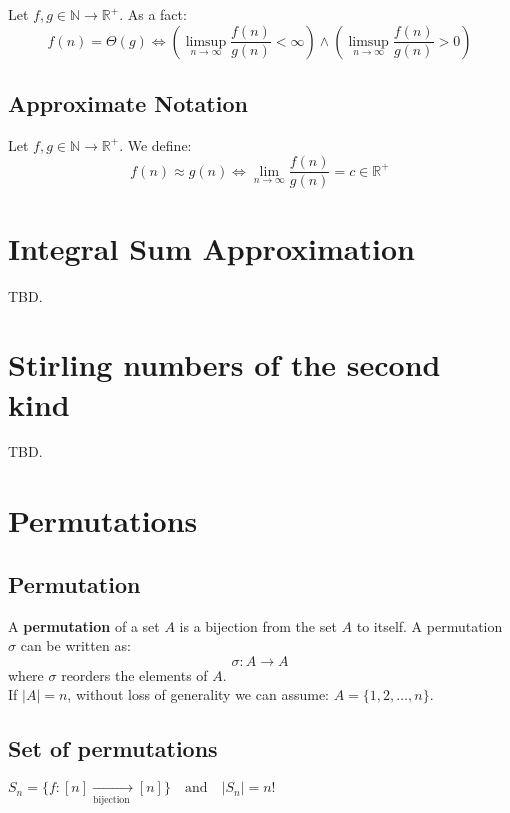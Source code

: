 \documentclass{article}
\newenvironment{definition}[1]{%
    \trivlist
    \item[\hskip\labelsep\textbf{Definition. #1.}]
    \ignorespaces
}{%
    \endtrivlist
}
\newenvironment{fact}[1]{%
    \trivlist
    \item[\hskip\labelsep\textbf{Fact. #1.}]
    \ignorespaces
}{%
    \endtrivlist
}
\begin{document}
\begin{fact}{Big Theta Limit}
    Let $f,g \in\mathbb{N}\rightarrow\mathbb{R}^{+}$. As a fact:
    \[f(n)=\Theta(g) \iff \left(\limsup_{n\rightarrow\infty} \frac{f(n)}{g(n)} < \infty \right) \land \left(\limsup_{n\rightarrow\infty} \frac{f(n)}{g(n)} > 0 \right)\]
\end{fact}

\subsection{Approximate Notation}

\begin{definition}{$\approx$ Notation}
    Let $f,g \in\mathbb{N}\rightarrow\mathbb{R}^{+}$. We define:
    \[f(n) \approx g(n) \iff \lim_{n\rightarrow \infty} \frac{f(n)}{g(n)} = c \in \mathbb{R}^{+}\]
\end{definition}

\section{Integral Sum Approximation}

TBD.

\section{Stirling numbers of the second kind}

TBD.

\section{Permutations}


\subsection{Permutation}
A \textbf{permutation} of a set \(A\) is a bijection from the set \(A\) to itself. A permutation \(\sigma\) can be written as:
\[\sigma : A \to A\]
where \(\sigma\) reorders the elements of \(A\).\\
If \(|A|=n\), without loss of generality we can assume: \(A = \{1, 2, \ldots, n\}\).

\subsection{Set of permutations}

\(S_n = \{f: [n]  \xrightarrow[\text{bijection }]{} [n]\} \quad \text{and} \quad |S_n| = n!\)
\end{document}
